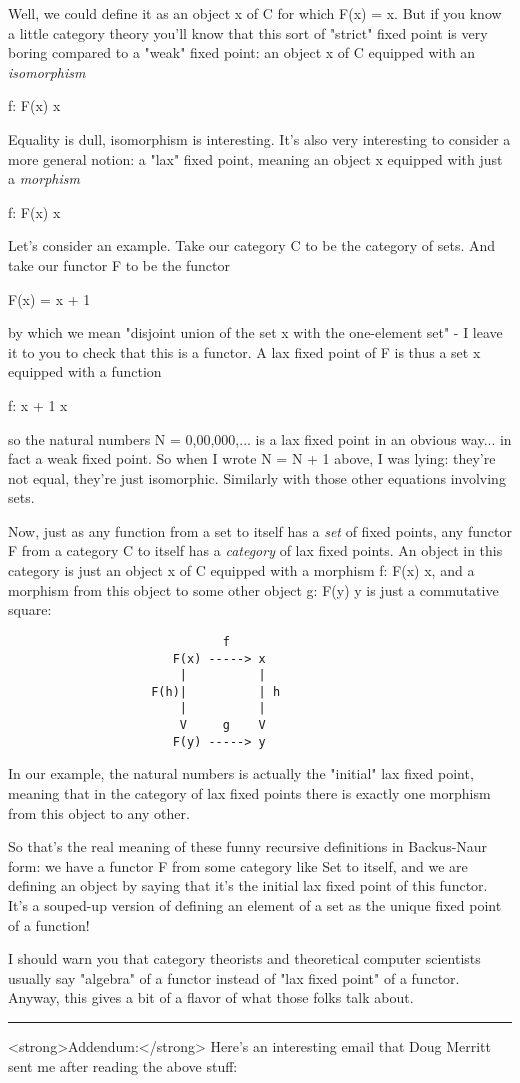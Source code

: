 Well, we could define it as an object x of C for which F(x) = x.  
But if you know a little category theory you'll know that this sort of
"strict" fixed point is very boring compared to a "weak" fixed point:
an object x of C equipped with an \emph{isomorphism} 

f: F(x) \to  x

Equality is dull, isomorphism is interesting.  It's also very
interesting to consider a more general notion: a "lax" fixed point,
meaning an object x equipped with just a \emph{morphism}

f: F(x) \to  x

Let's consider an example.  Take our category C to be the category
of sets.  And take our functor F to be the functor 

F(x) = x + 1

by which we mean "disjoint union of the set x with the one-element set"
- I leave it to you to check that this is a functor.  A lax fixed
point of F is thus a set x equipped with a function

f: x + 1 \to  x

so the natural numbers N = {0,00,000,...} is a lax fixed point in an
obvious way... in fact a weak fixed point.  So when I wrote N = N + 1
above, I was lying: they're not equal, they're just isomorphic.
Similarly with those other equations involving sets.

Now, just as any function from a set to itself has a \emph{set} of fixed
points, any functor F from a category C to itself has a \emph{category} of
lax fixed points.  An object in this category is just an object x of C
equipped with a morphism f: F(x) \to  x, and a morphism from this object
to some other object g: F(y) \to  y is just a commutative square:
\begin{verbatim}
                              f
                       F(x) -----> x
                        |          |
                    F(h)|          | h
                        |          |
                        V     g    V
                       F(y) -----> y

\end{verbatim}
    
In our example, the natural numbers is actually the "initial" lax
fixed point, meaning that in the category of lax fixed points there
is exactly one morphism from this object to any other.  

So that's the real meaning of these funny recursive definitions in 
Backus-Naur form: we have a functor F from some category like Set to
itself, and we are defining an object by saying that it's the initial
lax fixed point of this functor.  It's a souped-up version of defining
an element of a set as the unique fixed point of a function!

I should warn you that category theorists and theoretical computer
scientists usually say "algebra" of a functor instead of "lax fixed
point" of a functor.  Anyway, this gives a bit of a flavor of what those
folks talk about.
\par\noindent\rule{\textwidth}{0.4pt}
<strong>Addendum:</strong>
Here's an interesting email that Doug Merritt sent me after
reading the above stuff:


